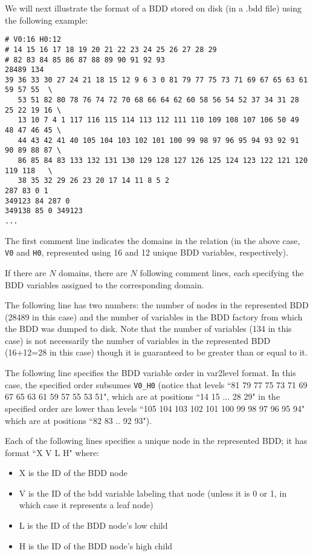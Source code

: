 We will next illustrate the format of a BDD stored on disk (in a .bdd file) using the following example:

\begin{framed}
\begin{verbatim}
# V0:16 H0:12
# 14 15 16 17 18 19 20 21 22 23 24 25 26 27 28 29
# 82 83 84 85 86 87 88 89 90 91 92 93
28489 134
39 36 33 30 27 24 21 18 15 12 9 6 3 0 81 79 77 75 73 71 69 67 65 63 61 59 57 55  \
   53 51 82 80 78 76 74 72 70 68 66 64 62 60 58 56 54 52 37 34 31 28 25 22 19 16 \
   13 10 7 4 1 117 116 115 114 113 112 111 110 109 108 107 106 50 49 48 47 46 45 \
   44 43 42 41 40 105 104 103 102 101 100 99 98 97 96 95 94 93 92 91 90 89 88 87 \
   86 85 84 83 133 132 131 130 129 128 127 126 125 124 123 122 121 120 119 118   \
   38 35 32 29 26 23 20 17 14 11 8 5 2
287 83 0 1
349123 84 287 0
349138 85 0 349123
...
\end{verbatim}
\end{framed}

The first comment line indicates the domains in the relation (in the above case, {\tt V0} and {\tt H0},
represented using 16 and 12 unique BDD variables, respectively).

If there are $N$ domains, there are $N$ following comment lines, each specifying the
BDD variables assigned to the corresponding domain.

The following line has two numbers: the number of nodes in the represented BDD (28489 in this case) and the number of variables
in the BDD factory from which the BDD was dumped to disk.  Note that the number of variables (134 in this case) is not
necessarily the number of variables in the represented BDD (16+12=28 in this case) though it is guaranteed to be
greater than or equal to it.

The following line specifies the BDD variable order in var2level format.  In this case, the specified order subsumes
{\tt V0\_H0} (notice that levels ``81 79 77 75 73 71 69 67 65 63 61 59 57 55 53 51", which are at positions ``14 15 ... 28 29" 
in the specified order are lower than levels ``105 104 103 102 101 100 99 98 97 96 95 94" which are at positions
``82 83 .. 92 93"). 

Each of the following lines specifies a unique node in the represented BDD; it has format ``X V L H" where:
\begin{itemize}
\item X is the ID of the BDD node
\item V is the ID of the bdd variable labeling that node (unless it is 0 or 1, in which case it represents a leaf node)
\item L is the ID of the BDD node's low child
\item H is the ID of the BDD node's high child
\end{itemize}

